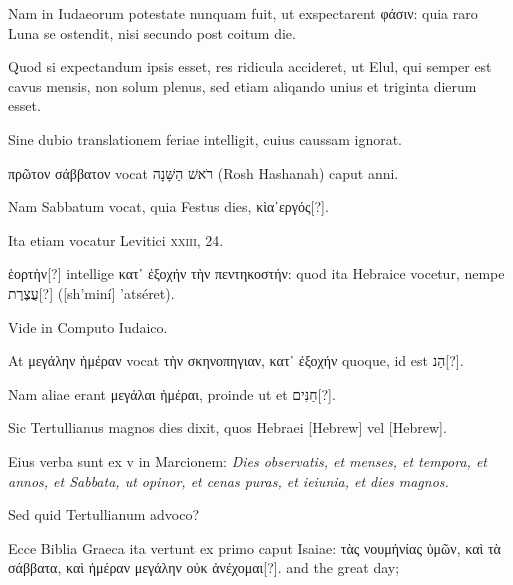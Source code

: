 \begin{parnumbers}
Nam in Iudaeorum potestate
nunquam fuit, ut exspectarent \textgreek{φάσιν}:
 quia raro Luna se ostendit,
nisi secundo post coitum die.

Quod si expectandum ipsis esset,
res ridicula accideret, ut Elul, qui semper est cavus mensis, non solum
plenus, sed etiam aliqando unius et triginta dierum esset.

Sine dubio translationem feriae intelligit, cuius caussam ignorat.

\textgreek{πρῶτον σάββατον} vocat
 \texthebrew{רֹאשׁ הַשָּׁנָה‎} (Rosh Hashanah) caput anni.

Nam Sabbatum vocat, quia Festus
dies, \textgreek{κὶα᾽εργός}[?].

Ita etiam vocatur Levitici \textsc{xxiii}, 24.

\textgreek{ἑορτὴν}[?]
 intellige
\textgreek{κατ᾽ ἐξοχήν τὴν πεντηκοστήν}:
 quod ita Hebraice vocetur, nempe \texthebrew{עֲצֶרֶת}[?] ([sh'miní] 'atséret).
 
Vide in Computo Iudaico.

At \textgreek{μεγάλην ἡμέραν}
 vocat \textgreek{τὴν σκηνοπηγιαν, κατ᾽ ἐξοχήν}
 quoque, id est \texthebrew{הַנ}[?].

Nam aliae erant \textgreek{μεγάλαι ἡμέραι},
proinde ut et \texthebrew{חַנִּים}[?].

Sic Tertullianus magnos dies dixit, quos
Hebraei \texthebrew{[Hebrew]} vel \texthebrew{[Hebrew]}.

Eius verba sunt ex v in Marcionem:
\textit{Dies observatis, et menses, et tempora, et annos, et Sabbata, ut opinor,
et cenas puras, et ieiunia, et dies magnos.}

Sed quid Tertullianum
advoco?

Ecce Biblia Graeca ita vertunt ex primo caput Isaiae:
\textgreek{τὰς νουμἠνίας ὑμῶν, καὶ τὰ σάββατα,
 καὶ ἡμέραν μεγάλην οὐκ ἀνέχομαι}[?].
 and the great day;


\end{parnumbers}
